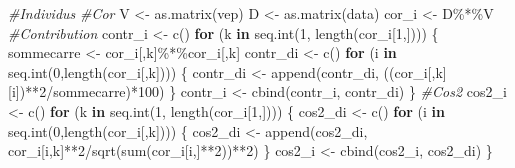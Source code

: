 \documentclass[
]{article}
\newenvironment{Shaded}{\begin{snugshade}}{\end{snugshade}}
\newcommand{\CommentTok}[1]{\textcolor[rgb]{0.56,0.35,0.01}{\textit{#1}}}
\newcommand{\ControlFlowTok}[1]{\textcolor[rgb]{0.13,0.29,0.53}{\textbf{#1}}}
\newcommand{\DecValTok}[1]{\textcolor[rgb]{0.00,0.00,0.81}{#1}}
\newcommand{\FunctionTok}[1]{\textcolor[rgb]{0.00,0.00,0.00}{#1}}
\newcommand{\NormalTok}[1]{#1}
\newcommand{\OtherTok}[1]{\textcolor[rgb]{0.56,0.35,0.01}{#1}}
\newcommand{\SpecialCharTok}[1]{\textcolor[rgb]{0.00,0.00,0.00}{#1}}
\begin{document}
\begin{Shaded}
\begin{Highlighting}[]
    \CommentTok{\#Individus}
      \CommentTok{\#Cor}
\NormalTok{  V }\OtherTok{\textless{}{-}} \FunctionTok{as.matrix}\NormalTok{(vep)}
\NormalTok{  D }\OtherTok{\textless{}{-}} \FunctionTok{as.matrix}\NormalTok{(data)}
\NormalTok{  cor\_i }\OtherTok{\textless{}{-}}\NormalTok{ D}\SpecialCharTok{\%*\%}\NormalTok{V}
      \CommentTok{\#Contribution}
\NormalTok{  contr\_i }\OtherTok{\textless{}{-}} \FunctionTok{c}\NormalTok{()}
  \ControlFlowTok{for}\NormalTok{ (k }\ControlFlowTok{in} \FunctionTok{seq.int}\NormalTok{(}\DecValTok{1}\NormalTok{, }\FunctionTok{length}\NormalTok{(cor\_i[}\DecValTok{1}\NormalTok{,]))) \{}
\NormalTok{    sommecarre }\OtherTok{\textless{}{-}}\NormalTok{ cor\_i[,k]}\SpecialCharTok{\%*\%}\NormalTok{cor\_i[,k]}
\NormalTok{    contr\_di }\OtherTok{\textless{}{-}} \FunctionTok{c}\NormalTok{()}
    \ControlFlowTok{for}\NormalTok{ (i }\ControlFlowTok{in} \FunctionTok{seq.int}\NormalTok{(}\DecValTok{0}\NormalTok{,}\FunctionTok{length}\NormalTok{(cor\_i[,k]))) \{}
\NormalTok{      contr\_di }\OtherTok{\textless{}{-}} \FunctionTok{append}\NormalTok{(contr\_di, ((cor\_i[,k][i])}\SpecialCharTok{**}\DecValTok{2}\SpecialCharTok{/}\NormalTok{sommecarre)}\SpecialCharTok{*}\DecValTok{100}\NormalTok{)}
\NormalTok{    \}}
\NormalTok{    contr\_i }\OtherTok{\textless{}{-}} \FunctionTok{cbind}\NormalTok{(contr\_i, contr\_di)}
\NormalTok{  \}}
      \CommentTok{\#Cos2}
\NormalTok{  cos2\_i }\OtherTok{\textless{}{-}} \FunctionTok{c}\NormalTok{()}
  \ControlFlowTok{for}\NormalTok{ (k }\ControlFlowTok{in} \FunctionTok{seq.int}\NormalTok{(}\DecValTok{1}\NormalTok{, }\FunctionTok{length}\NormalTok{(cor\_i[}\DecValTok{1}\NormalTok{,]))) \{}
\NormalTok{    cos2\_di }\OtherTok{\textless{}{-}} \FunctionTok{c}\NormalTok{()}
    \ControlFlowTok{for}\NormalTok{ (i }\ControlFlowTok{in} \FunctionTok{seq.int}\NormalTok{(}\DecValTok{0}\NormalTok{,}\FunctionTok{length}\NormalTok{(cor\_i[,k]))) \{}
\NormalTok{      cos2\_di }\OtherTok{\textless{}{-}} \FunctionTok{append}\NormalTok{(cos2\_di, cor\_i[i,k]}\SpecialCharTok{**}\DecValTok{2}\SpecialCharTok{/}\FunctionTok{sqrt}\NormalTok{(}\FunctionTok{sum}\NormalTok{(cor\_i[i,]}\SpecialCharTok{**}\DecValTok{2}\NormalTok{))}\SpecialCharTok{**}\DecValTok{2}\NormalTok{)}
\NormalTok{    \}}
\NormalTok{    cos2\_i }\OtherTok{\textless{}{-}} \FunctionTok{cbind}\NormalTok{(cos2\_i, cos2\_di)}
\NormalTok{  \}}
  

\end{Highlighting}
\end{Shaded}
\end{document}
